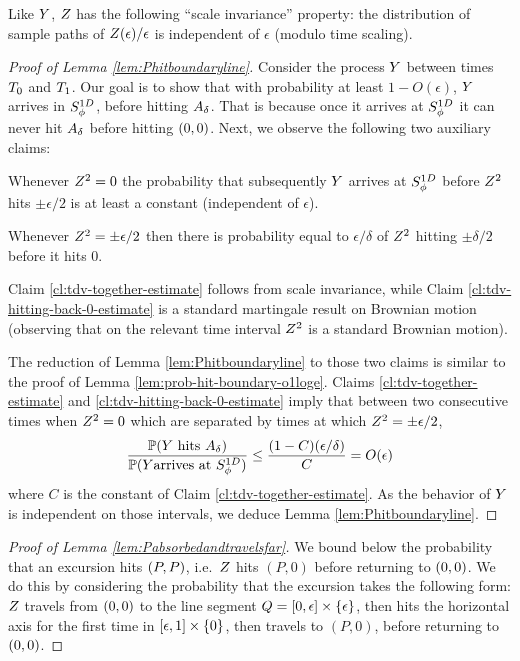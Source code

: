 {{Like $Y$, $Z$ has the following ``scale invariance''
property: the distribution of sample paths of $Z(\epsilon) /
\epsilon$ is independent of $\epsilon$ (modulo time scaling).

\begin{proof}[Proof of Lemma \ref{lem:Phitboundaryline}]
Consider the process $Y$ between times $T_0$ and
$T_1$. Our goal is to show that with probability at least
$1-O(\epsilon)$, $Y$ arrives in $S^{1D}_{\phi}$, before hitting
$A_\delta$. That is because once it arrives at $S^{1D}_{\phi}$ it
can never hit $A_\delta$ before hitting $(0,0)$. Next, we observe the
following two auxiliary claims:

\begin{claim}\label{cl:tdv-together-estimate}
  Whenever $Z^2=0$ the probability that subsequently $Y$
  arrives at $S^{1D}_{\phi}$ before $Z^2$ hits $\pm\epsilon/2$ is at
  least a constant (independent of $\epsilon$).
\end{claim}

\begin{claim}\label{cl:tdv-hitting-back-0-estimate}
  Whenever $Z^2=\pm\epsilon/2$ then there is probability equal to
  $\epsilon/\delta$ of $Z^2$ hitting $\pm\delta/2$ before it hits $0$.
\end{claim}

Claim \ref{cl:tdv-together-estimate} follows from scale invariance, while
Claim \ref{cl:tdv-hitting-back-0-estimate} is a standard martingale result on
Brownian motion (observing that on the relevant time interval $Z^2$ is a
standard Brownian motion).

The reduction of Lemma \ref{lem:Phitboundaryline} to those two claims is
similar to the proof of Lemma \ref{lem:prob-hit-boundary-o1loge}. Claims
\ref{cl:tdv-together-estimate} and \ref{cl:tdv-hitting-back-0-estimate} imply
that between two consecutive times when $Z^2=0$ which are separated
by times at which $Z^2 = \pm\epsilon/2$,
\[
\frac{\mathbb{P}(Y\text{ hits }A_\delta)}{\mathbb{P}(Y\text{arrives at }S^{1D}_{\phi})}
\le \frac{(1-C)(\epsilon/\delta)}{C} =O(\epsilon)
\]
where $C$ is the constant of Claim \ref{cl:tdv-together-estimate}. As the
behavior of $Y$ is independent on those intervals, we deduce Lemma
\ref{lem:Phitboundaryline}.

\end{proof}
}
\begin{proof}[Proof of Lemma \ref{lem:Pabsorbedandtravelsfar}]
\newcommand{\rotfarpoint}{(P,0)}
\newcommand{\segment}{[\epsilon,1] \cross \{0\}}
We bound below the probability that an excursion hits $(P,P)$,
i.e.\ $Z$ hits $\rotfarpoint$ before returning to $(0,0)$.
We do this by considering the probability that the excursion takes
the following form: $Z$ travels from $(0,0)$ to the line
segment $Q = [0, \epsilon] \times \{\epsilon\}$, then hits the horizontal
axis for the first time in $\segment$, then travels to $\rotfarpoint$,
before returning to $(0,0)$.


\end{proof}}
